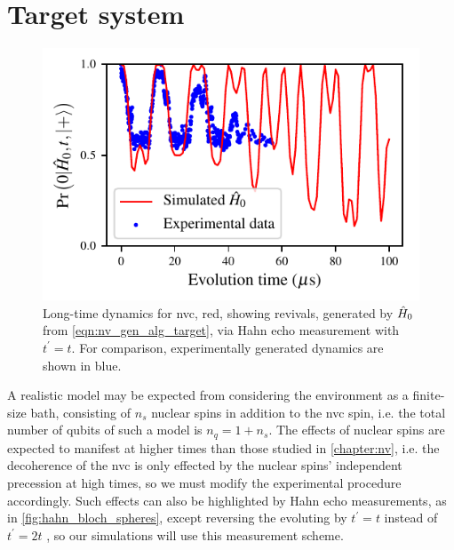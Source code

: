 \section{Target system}
\begin{figure}
    \begin{center}
        \includegraphics{experimental_study/figures/nv_revival_raw_data.pdf}
    \end{center}
    \caption[Long-time dynamics for nitrogen-vacancy centres]{
        Long-time dynamics for \acrlong{nvc}, red, showing revivals, 
            generated by $\hat{H}_0$ from \cref{eqn:nv_gen_alg_target}, via Hahn echo measurement with $t^{\prime} = t$.
        For comparison, experimentally generated dynamics are shown in blue. 
    }
    \label{fig:nv_revival_raw}
\end{figure}
A realistic model may be expected from considering the environment as a finite-size bath, 
    consisting of $n_s$ nuclear spins in addition to the \gls{nvc} spin, 
    i.e. the total number of qubits of such a model is $n_q = 1 + n_s$.   
The effects of nuclear spins are expected to manifest at higher times than those studied in \cref{chapter:nv}, 
    i.e. the decoherence of the \gls{nvc} is only effected by the nuclear spins' independent precession at high times, 
    so we must modify the experimental procedure accordingly.
Such effects can also be highlighted by Hahn echo measurements, 
    as in \cref{fig:hahn_bloch_spheres}, 
    except reversing the evoluting by $t^{\prime} = t$ instead of $t^{\prime} = 2t$
    \cite{childress2006coherent, breuer2002theory}, so our simulations will use this measurement scheme. 
\par 

